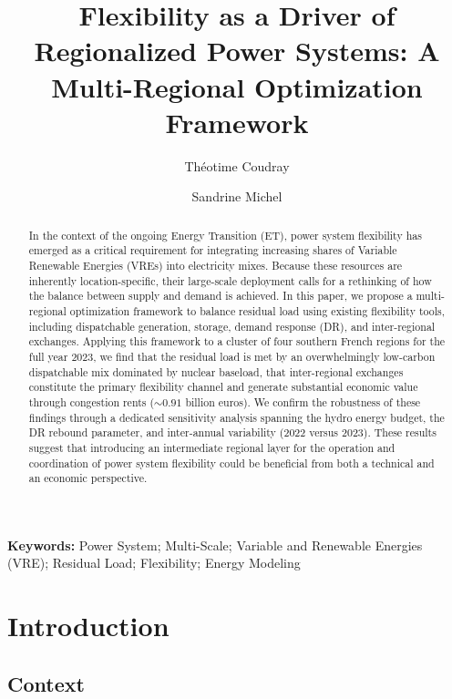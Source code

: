 \documentclass[12pt]{article}
\title{Flexibility as a Driver of Regionalized Power Systems:
A Multi-Regional Optimization Framework\\}
\author[1]{Théotime Coudray}
\author[2]{Sandrine Michel}
\affil[1]{Université de Versailles Saint-Quentin-en-Yvelines, UMI SOURCE}
\affil[2]{Université de Montpellier, UMR 5281 ART-Dev}
\date{ }
\begin{document}
\maketitle

\begin{abstract}
In the context of the ongoing Energy Transition (ET), power system flexibility has emerged as a critical requirement for integrating increasing shares of Variable Renewable Energies (VREs) into electricity mixes. Because these resources are inherently location-specific, their large-scale deployment calls for a rethinking of how the balance between supply and demand is achieved. In this paper, we propose a multi-regional optimization framework to balance residual load using existing flexibility tools, including dispatchable generation, storage, demand response (DR), and inter-regional exchanges. Applying this framework to a cluster of four southern French regions for the full year 2023, we find that the residual load is met by an overwhelmingly low-carbon dispatchable mix dominated by nuclear baseload, that inter-regional exchanges constitute the primary flexibility channel and generate substantial economic value through congestion rents (\(\sim 0.91\) billion euros). We confirm the robustness of these findings through a dedicated sensitivity analysis spanning the hydro energy budget, the DR rebound parameter, and inter-annual variability (2022 versus 2023). These results suggest that introducing an intermediate regional layer for the operation and coordination of power system flexibility could be beneficial from both a technical and an economic perspective.
\end{abstract}



\begin{center}
\textbf{Keywords:} Power System; Multi-Scale; Variable and Renewable Energies (VRE); Residual Load; Flexibility; Energy Modeling
\end{center}

\vspace{1em}


\section{Introduction}

\subsection{Context}
\end{document}
